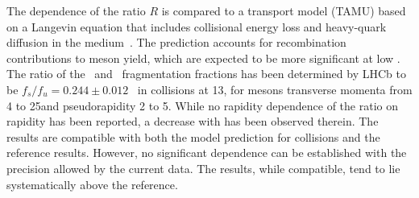 The \pt dependence of the ratio $R$ is compared to 
 a transport model (TAMU) based on a Langevin equation that includes collisional energy loss and heavy-quark diffusion in the medium~\cite{tamu14}.
 The prediction accounts for recombination contributions to \PBzs meson yield, which are expected to be more significant at low \pt. 
%
%
The ratio of the \PBzs\ and \PBp\ fragmentation fractions has been determined by LHCb to be  $f_s/f_u =0.244\pm0.012$~\cite{fsfulhcb2020} in  \pp collisions at 13\TeV, for \PB mesons transverse momenta from 4 to 25\GeVc and pseudorapidity 2 to 5. While no rapidity dependence of the ratio on rapidity has been reported, a decrease with \pt has been observed therein. 
The results are compatible with both the model prediction for \PbPb collisions and the \pp reference results. However, no significant \pt dependence can be established with the precision allowed by the current data. 
%
%
The results, %
while compatible, tend to lie systematically above the \TeV reference. 

